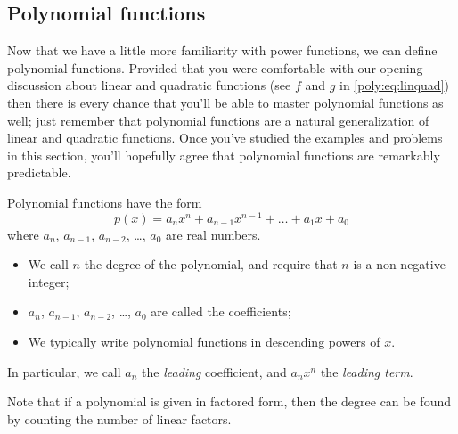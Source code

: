 \subsection*{Polynomial functions}
Now that we have a little more familiarity with power functions,
we can define polynomial functions. Provided that you were comfortable
with our opening discussion about linear and quadratic functions (see
$f$ and $g$ in \cref{poly:eq:linquad}) then there is every chance
that you'll be able to master polynomial functions as well; just remember
that polynomial functions are a natural generalization of linear
and quadratic functions. Once you've studied the examples and problems
in this section, you'll hopefully agree that polynomial functions
are remarkably predictable.

\begin{pccdefinition}
	Polynomial functions have the form
	\[
		p(x)=a_nx^n+a_{n-1}x^{n-1}+\ldots+a_1x+a_0
	\]
	where $a_n$, $a_{n-1}$, $a_{n-2}$, \ldots, $a_0$ are real numbers.
	\begin{itemize}
		\item We call $n$ the degree of the polynomial, and require that $n$
		      is a non-negative integer;
		\item $a_n$, $a_{n-1}$, $a_{n-2}$, \ldots, $a_0$ are called the coefficients;
		\item We typically write polynomial functions in descending powers of $x$.
	\end{itemize}
	In particular, we call $a_n$ the \emph{leading} coefficient, and $a_nx^n$ the
	\emph{leading term}.

	Note that if a polynomial is given in factored form, then the degree can be found
	by counting the number of linear factors.
\end{pccdefinition}

